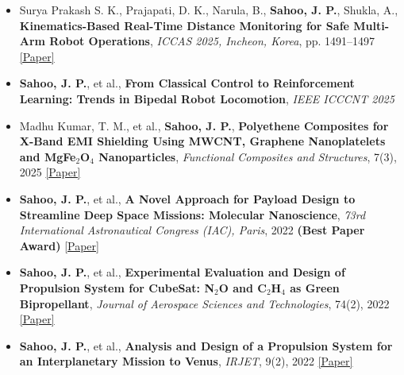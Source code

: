 \documentclass[letterpaper,10pt]{article}
\newcommand{\me}{\textbf{Sahoo, J. P.}}
\newenvironment{bullets}{\begin{itemize}[label=\textbullet]\small}{\end{itemize}\vspace{-2pt}}
\begin{document}
\begin{bullets}
  \item Surya Prakash S. K., Prajapati, D. K., Narula, B., \me, Shukla, A., \textbf{Kinematics-Based Real-Time Distance Monitoring for Safe Multi-Arm Robot Operations}, \textit{ICCAS 2025, Incheon, Korea}, pp. 1491--1497 \href{https://doi.org/10.23919/iccas66577.2025.11301286}{[Paper]}
  \item \me, et al., \textbf{From Classical Control to Reinforcement Learning: Trends in Bipedal Robot Locomotion}, \textit{IEEE ICCCNT 2025}
  \item Madhu Kumar, T. M., et al., \me, \textbf{Polyethene Composites for X-Band EMI Shielding Using MWCNT, Graphene Nanoplatelets and MgFe$_2$O$_4$ Nanoparticles}, \textit{Functional Composites and Structures}, 7(3), 2025 \href{https://doi.org/10.1088/2631-6331/adf68a}{[Paper]}
  \item \me, et al., \textbf{A Novel Approach for Payload Design to Streamline Deep Space Missions: Molecular Nanoscience}, \textit{73rd International Astronautical Congress (IAC), Paris}, 2022 \textbf{(Best Paper Award)} \href{https://iafastro.directory/iac/archive/browse/IAC-22/C2/8/70075/}{[Paper]}
  \item \me, et al., \textbf{Experimental Evaluation and Design of Propulsion System for CubeSat: N$_2$O and C$_2$H$_4$ as Green Bipropellant}, \textit{Journal of Aerospace Sciences and Technologies}, 74(2), 2022 \href{https://doi.org/10.61653/joast.v74i2.2022.32}{[Paper]}
  \item \me, et al., \textbf{Analysis and Design of a Propulsion System for an Interplanetary Mission to Venus}, \textit{IRJET}, 9(2), 2022 \href{https://www.irjet.net/archives/V9/i2/IRJET-V9I257.pdf}{[Paper]}
\end{bullets}

\end{document}
